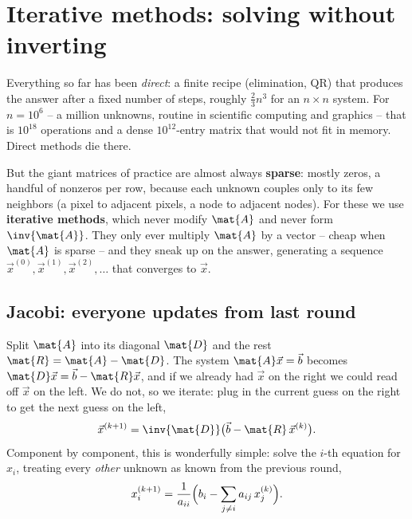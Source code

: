 \section{Iterative methods: solving without inverting}

Everything so far has been \emph{direct}: a finite recipe (elimination, QR) that
produces the answer after a fixed number of steps, roughly $\tfrac23 n^3$ for an
$n\times n$ system. For $n=10^6$ -- a million unknowns, routine in scientific computing
and graphics -- that is $10^{18}$ operations and a dense $10^{12}$-entry matrix that
would not fit in memory. Direct methods die there.

But the giant matrices of practice are almost always \textbf{sparse}: mostly zeros, a
handful of nonzeros per row, because each unknown couples only to its few neighbors (a
pixel to adjacent pixels, a node to adjacent nodes). For these we use
\textbf{iterative methods}, which never modify $\mat{A}$ and never form $\inv{\mat{A}}$.
They only ever multiply $\mat{A}$ by a vector -- cheap when $\mat{A}$ is sparse -- and
they sneak up on the answer, generating a sequence $\vec{x}^{(0)},
\vec{x}^{(1)},\vec{x}^{(2)},\ldots$ that converges to $\vec{x}$.

\subsection{Jacobi: everyone updates from last round}

Split $\mat{A}$ into its diagonal $\mat{D}$ and the rest $\mat{R}=\mat{A}-\mat{D}$.
The system $\mat{A}\vec{x}=\vec{b}$ becomes $\mat{D}\vec{x} = \vec{b}-\mat{R}\vec{x}$,
and if we already had $\vec{x}$ on the right we could read off $\vec{x}$ on the left.
We do not, so we iterate: plug in the current guess on the right to get the next guess
on the left,
\[
  \vec{x}^{(k+1)} = \inv{\mat{D}}\bigl(\vec{b} - \mat{R}\,\vec{x}^{(k)}\bigr).
\]
Component by component, this is wonderfully simple: solve the $i$-th equation for
$x_i$, treating every \emph{other} unknown as known from the previous round,
\[
  x_i^{(k+1)} = \frac{1}{a_{ii}}\Bigl(b_i - \sum_{j\ne i} a_{ij}\,x_j^{(k)}\Bigr).
\]

